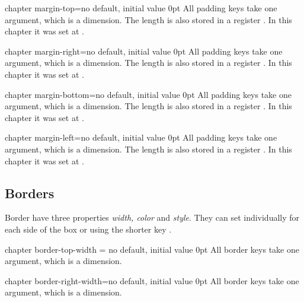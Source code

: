 
\begin{docKey}[]{chapter margin-top}{=}{no default, initial value 0pt}
All padding keys take one argument, which is a dimension. The length is also stored in a register
\cmd{\chaptermargintop}. In this chapter it was set at .
\end{docKey}

\begin{docKey}[]{chapter margin-right}{=}{no default, initial value 0pt}
All padding keys take one argument, which is a dimension. The length is also stored in a register
\cmd{\chapterpaddingright}.  In this chapter it was set at \the\chapterpaddingright.
\end{docKey}

\begin{docKey}[]{chapter margin-bottom}{=}{no default, initial value 0pt}
All padding keys take one argument, which is a dimension. The length is also stored in a register
\cmd{\chapterpaddingbottom}.  In this chapter it was set at \the\chapterpaddingbottom.
\end{docKey}

\begin{docKey}[]{chapter margin-left}{=}{no default, initial value 0pt}
All padding keys take one argument, which is a dimension. The length is also stored in a register
\cmd{\chaptermarginleft}.  In this chapter it was set at \the\chaptermarginleft.
\end{docKey}

\subsection{Borders}

Border have three properties \emph{width, color} and \emph{style}. They can set individually for
each side of the box or using the shorter key .

\begin{docKey}[]{chapter border-top-width}{ = }{no default, initial value 0pt}
All border keys take one argument, which is a dimension.
\end{docKey}

\begin{docKey}[]{chapter border-right-width}{=}{no default, initial value 0pt}
All border keys take one argument, which is a dimension.
\end{docKey}

